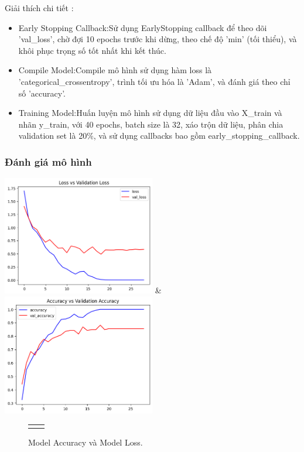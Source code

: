 Giải thích chi tiết : 
\begin{itemize}
    \item Early Stopping Callback:Sử dụng EarlyStopping callback để theo dõi 'val\_loss', chờ đợi 10 epochs trước khi dừng, theo chế độ 'min' (tối thiểu), và khôi phục trọng số tốt nhất khi kết thúc.
    \item Compile Model:Compile mô hình sử dụng hàm loss là 'categorical\_crossentropy', trình tối ưu hóa là 'Adam', và đánh giá theo chỉ số 'accuracy'.
    \item Training Model:Huấn luyện mô hình sử dụng dữ liệu đầu vào X\_train và nhãn y\_train, với 40 epochs, batch size là 32, xáo trộn dữ liệu, phân chia validation set là 20\%, và sử dụng callbacks bao gồm early\_stopping\_callback.
\end{itemize}

\subsubsection{Đánh giá mô hình}
\includegraphics[width=0.5\textwidth]{Figures/loss_conv.png} \&
		\includegraphics[width=0.5\textwidth]{Figures/val_conv.png}
\begin{figure}[h!] 
	\begin{tabular}{cc}
		\centering
		 
	\end{tabular}
	\caption[Model Accuracy và Model Loss.]{Model Accuracy và Model Loss.}
	\label{fig:modelloss_and_Model Accuracy}
\end{figure}

